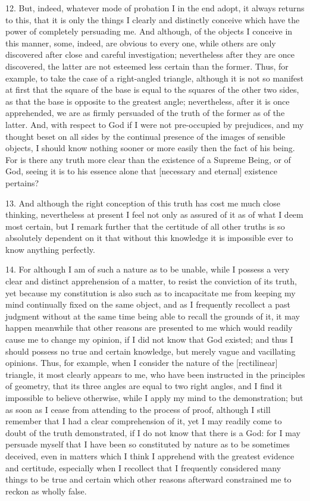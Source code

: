 12. But, indeed, whatever mode of probation I in the end adopt, it always returns to this, that it is only the things I clearly and distinctly conceive which have the power of completely persuading me. And although, of the objects I conceive in this manner, some, indeed, are obvious to every one, while others are only discovered after close and careful investigation; nevertheless after they are once discovered, the latter are not esteemed less certain than the former. Thus, for example, to take the case of a right-angled triangle, although it is not so manifest at first that the square of the base is equal to the squares of the other two sides, as that the base is opposite to the greatest angle; nevertheless, after it is once apprehended, we are as firmly persuaded of the truth of the former as of the latter. And, with respect to God if I were not pre-occupied by prejudices, and my thought beset on all sides by the continual presence of the images of sensible objects, I should know nothing sooner or more easily then the fact of his being. For is there any truth more clear than the existence of a Supreme Being, or of God, seeing it is to his essence alone that [necessary and eternal] existence pertains?

13. And although the right conception of this truth has cost me much close thinking, nevertheless at present I feel not only as assured of it as of what I deem most certain, but I remark further that the certitude of all other truths is so absolutely dependent on it that without this knowledge it is impossible ever to know anything perfectly.

14. For although I am of such a nature as to be unable, while I possess a very clear and distinct apprehension of a matter, to resist the conviction of its truth, yet because my constitution is also such as to incapacitate me from keeping my mind continually fixed on the same object, and as I frequently recollect a past judgment without at the same time being able to recall the grounds of it, it may happen meanwhile that other reasons are presented to me which would readily cause me to change my opinion, if I did not know that God existed; and thus I should possess no true and certain knowledge, but merely vague and vacillating opinions. Thus, for example, when I consider the nature of the [rectilinear] triangle, it most clearly appears to me, who have been instructed in the principles of geometry, that its three angles are equal to two right angles, and I find it impossible to believe otherwise, while I apply my mind to the demonstration; but as soon as I cease from attending to the process of proof, although I still remember that I had a clear comprehension of it, yet I may readily come to doubt of the truth demonstrated, if I do not know that there is a God: for I may persuade myself that I have been so constituted by nature as to be sometimes deceived, even in matters which I think I apprehend with the greatest evidence and certitude, especially when I recollect that I frequently considered many things to be true and certain which other reasons afterward constrained me to reckon as wholly false.

